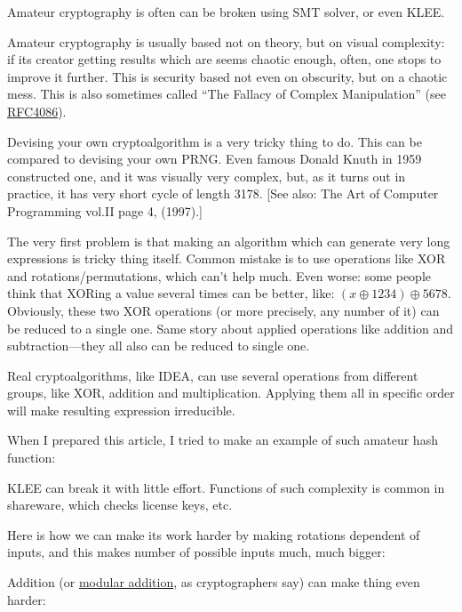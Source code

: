 Amateur cryptography is often can be broken using SMT solver, or even KLEE.

Amateur cryptography is usually based not on theory, but on visual complexity:
if its creator getting results which are seems chaotic enough, often, one stops to improve it further.
This is security based not even on obscurity, but on a chaotic mess.
This is also sometimes called ``The Fallacy of Complex Manipulation''
(see \href{https://tools.ietf.org/html/rfc4086}{RFC4086}).

Devising your own cryptoalgorithm is a very tricky thing to do.
This can be compared to devising your own \ac{PRNG}.
Even famous Donald Knuth in 1959 constructed one, and it was visually very complex,
but, as it turns out in practice, it has very short cycle of length 3178.
[See also: The Art of Computer Programming vol.II page 4, (1997).]

The very first problem is that making an algorithm which can generate very long expressions is tricky thing itself.
Common mistake is to use operations like XOR and rotations/permutations, which can't help much.
Even worse: some people think that XORing a value several times can be better, like: $(x \oplus 1234) \oplus 5678$.
Obviously, these two XOR operations (or more precisely, any number of it) can be reduced to a single one.
Same story about applied operations like addition and subtraction---they all also can be reduced to single one.

Real cryptoalgorithms, like IDEA, can use several operations from different groups, like XOR, addition and multiplication.
Applying them all in specific order will make resulting expression irreducible.

When I prepared this article, I tried to make an example of such amateur hash function:



KLEE can break it with little effort.
Functions of such complexity is common in shareware, which checks license keys, etc.

Here is how we can make its work harder by making rotations dependent of inputs,
and this makes number of possible inputs much, much bigger:



Addition (or \href{https://yurichev.com/blog/modulo/}{modular addition}, as cryptographers say) can make thing even harder:



